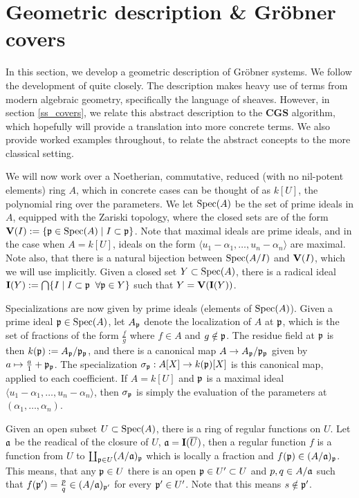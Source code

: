 \section{Geometric description \& Gröbner covers} \label{sec:grb_covers}
In this section, we develop a geometric description of Gröbner systems. We follow the development of \cite{grb_covers} quite closely. The description makes heavy use of terms from modern algebraic geometry, specifically the language of sheaves. However, in section \ref{ss_covers}, we relate this abstract description to the $\mathbf{CGS}$ algorithm, which hopefully will provide a translation into more concrete terms. We also provide worked examples throughout, to relate the abstract concepts to the more classical setting.

We will now work over a Noetherian, commutative, reduced (with no nil-potent elements) ring $A$, which in concrete cases can be thought of as $k[U]$, the polynomial ring over the parameters. We let $\operatorname{Spec}(A)$ be the set of prime ideals in $A$, equipped with the Zariski topology, where the closed sets are of the form $\operatorname{\mathbf V}(I) := \{\mathfrak p \in \operatorname{Spec}(A) \mid I \subset \mathfrak p\}$. Note that maximal ideals are prime ideals, and in the case when $A = k[U]$, ideals on the form $\langle u_{1} - \alpha_{1}, \dots, u_{n} - \alpha_{n} \rangle$ are maximal. Note also, that there is a natural bijection between $\operatorname{Spec}(A/I)$ and $\operatorname{\mathbf V}(I)$, which we will use implicitly. Given a closed set $Y \subset \operatorname{Spec}(A)$, there is a radical ideal $\operatorname{\mathbf I}(Y) := \bigcap\{I \mid I \subset \mathfrak p \;\; \forall \mathfrak p \in Y\}$ such that $Y = \operatorname{\mathbf V}(\operatorname{\mathbf I}(Y))$.

Specializations are now given by prime ideals (elements of $\operatorname{Spec}(A)$). Given a prime ideal $\mathfrak p \in \operatorname{Spec}(A)$, let $A_{\mathfrak p}$ denote the localization of $A$ at $\mathfrak p$, which is the set of fractions of the form $\frac{f}{g}$ where $f \in A$ and $g \notin \mathfrak p$. The residue field at $\mathfrak p$ is then $k(\mathfrak p) := A_{\mathfrak p}/\mathfrak p_{\mathfrak p}$, and there is a canonical map $A \to A_{\mathfrak p}/\mathfrak p_{\mathfrak p}$ given by $a \mapsto \frac a 1 + \mathfrak p_{\mathfrak p}$. The specialization $\sigma_{\mathfrak p} : A[X] \to k(\mathfrak p)[X]$ is this canonical map, applied to each coefficient. If $A = k[U]$ and $\mathfrak p$ is a maximal ideal $\langle u_{1} - \alpha_{1}, \dots, u_{n} - \alpha_{n} \rangle$, then $\sigma_{\mathfrak p}$ is simply the evaluation of the parameters at $(\alpha_{1}, \dots, \alpha_{n})$.

Given an open subset $U \subset \operatorname{Spec}(A)$, there is a ring of regular functions on $U$. Let $\mathfrak{a}$ be the readical of the closure of $U$, $\mathfrak{a} = \operatorname{\mathbf I}(\overline U)$, then a regular function $f$ is a function from $U$ to $\coprod_{\mathfrak p \in U} (A/\mathfrak{a})_{\mathfrak p}$ which is locally a fraction and $f(\mathfrak p) \in (A/\mathfrak{a})_{\mathfrak p}$. This means, that any $\mathfrak p \in U$ there is an open $\mathfrak p \in U' \subset U$ and $p, q \in A/\mathfrak{a}$ such that $f(\mathfrak p') = \frac p q \in (A/\mathfrak{a})_{\mathfrak p'}$ for every $\mathfrak p' \in U'$. Note that this means $s \notin \mathfrak p'$.

